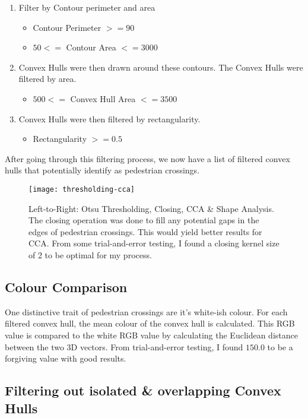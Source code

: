 \documentclass{article}  %
\begin{document}
	\begin{enumerate}
		\item Filter by Contour perimeter and area
		\begin{itemize}
			\item Contour Perimeter $>= 90$
			\item $50 <= $ Contour Area $ <= 3000$
		\end{itemize}
		\item Convex Hulls were then drawn around these contours. The Convex Hulls were filtered by area.
		\begin{itemize}
			\item $500 <= $ Convex Hull Area $ <= 3500$
		\end{itemize}
		\item Convex Hulls were then filtered by rectangularity.
		\begin{itemize}
			\item Rectangularity $>= 0.5$
		\end{itemize}
	\end{enumerate}
	
	After going through this filtering process, we now have a list of filtered convex hulls that potentially identify as pedestrian crossings.
	
	\begin{figure}[H]
		\centering
		\texttt{[image: thresholding-cca]}
		\caption{Left-to-Right: Otsu Thresholding, Closing, CCA \& Shape Analysis. The closing operation was done to fill any potential gaps in the edges of pedestrian crossings. This would yield better results for CCA. From some trial-and-error testing, I found a closing kernel size of 2 to be optimal for my process.}
		\label{otsu-cca}
	\end{figure}

	\subsection{Colour Comparison}\label{colour-distance}
	
	One distinctive trait of pedestrian crossings are it's white-ish colour. For each filtered convex hull, the mean colour of the convex hull is calculated. This RGB value is compared to the white RGB value by calculating the Euclidean distance between the two 3D vectors. From trial-and-error testing, I found $150.0$ to be a forgiving value with good results.
	
	\subsection{Filtering out isolated \& overlapping Convex Hulls}
	
\end{document}
